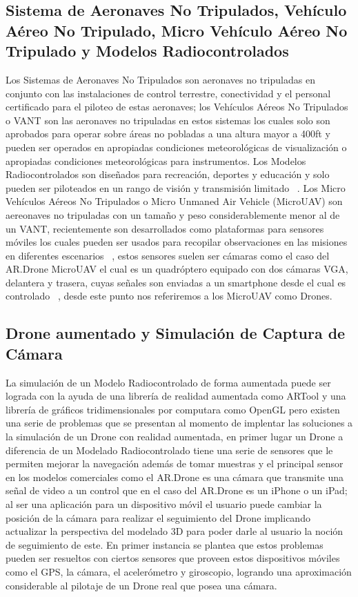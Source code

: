 \documentclass[a4paper]{article}
\begin{document}
\subsection{Sistema de Aeronaves No Tripulados, Vehículo Aéreo No Tripulado, Micro Vehículo Aéreo No Tripulado y Modelos Radiocontrolados}
Los Sistemas de Aeronaves No Tripulados son aeronaves no tripuladas en conjunto con las instalaciones de control terrestre, conectividad y el personal certificado para el piloteo de estas aeronaves; los Vehículos Aéreos No Tripulados o VANT son las aeronaves no tripuladas en estos sistemas los cuales solo son aprobados para operar sobre áreas no pobladas a una altura mayor a 400ft y pueden ser operados en apropiadas condiciones meteorológicas de visualización o apropiadas condiciones meteorológicas para instrumentos. Los Modelos Radiocontrolados son diseñados para recreación, deportes y educación y solo pueden ser piloteados en un rango de visión y transmisión limitado ~\cite{AusGov2013Online}.
Los Micro Vehículos Aéreos No Tripulados o Micro Unmaned Air Vehicle (MicroUAV)  son aereonaves no tripuladas con un tamaño y peso considerablemente menor al de un VANT, recientemente son desarrollados como plataformas para sensores móviles los cuales pueden ser usados para recopilar observaciones en las misiones en diferentes escenarios ~\cite{geipel2012microuav}, estos sensores suelen ser cámaras como el caso del AR.Drone MicroUAV el cual es un quadróptero equipado con dos cámaras VGA, delantera y trasera, cuyas señales son enviadas a un smartphone desde el cual es controlado ~\cite{ardrone2011}, desde este punto nos referiremos a los MicroUAV como Drones.

\subsection{Drone aumentado y Simulación de Captura de Cámara}
La simulación de un Modelo Radiocontrolado de forma aumentada puede ser lograda con la ayuda de una librería de realidad aumentada como ARTool y una librería de gráficos tridimensionales por computara como OpenGL pero existen una serie de problemas que se presentan al momento de implentar las soluciones a la simulación de un Drone con realidad aumentada, en primer lugar un Drone a diferencia de un Modelado Radiocontrolado tiene una serie de sensores que le permiten mejorar la navegación además de tomar muestras y el principal sensor en los modelos comerciales como el AR.Drone es una cámara que transmite una señal de video a un control que en el caso del AR.Drone es un iPhone o un iPad; al ser una aplicación para un dispositivo móvil el usuario puede cambiar la posición de la cámara para realizar el seguimiento del Drone implicando actualizar la perspectiva del modelado 3D para poder darle al usuario la noción de seguimiento de este. En primer instancia se plantea que estos problemas pueden ser resueltos con ciertos sensores que proveen estos dispositivos móviles como el GPS, la cámara, el acelerómetro y giroscopio, logrando una aproximación considerable al pilotaje de un Drone real que posea una cámara.
\end{document}
